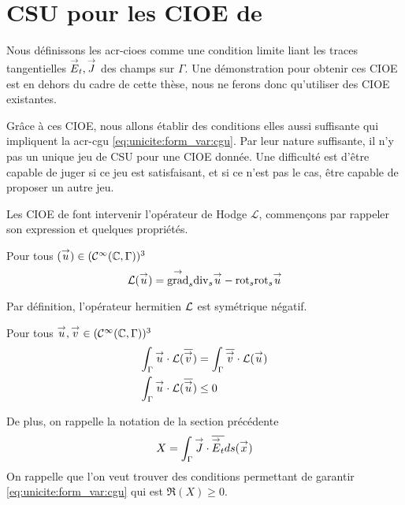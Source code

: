 \section{CSU pour les CIOE de \cite{stupfel_sufficient_2011}}

  Nous définissons les \glspl{acr-cioe} comme une condition limite liant les traces tangentielles \({\overset{\rightarrow}{E}}_t, {\overset{\rightarrow}{J}}\) des champs sur \(\Gamma\). Une démonstration pour obtenir ces CIOE est en dehors du cadre de cette thèse, nous ne ferons donc qu'utiliser des CIOE existantes. 

  Grâce à ces CIOE, nous allons établir des conditions elles aussi suffisante qui impliquent la \gls{acr-cgu} \eqref{eq:unicite:form_var:cgu}. Par leur nature suffisante, il n'y pas un unique jeu de CSU pour une CIOE donnée. Une difficulté est d'être capable de juger si ce jeu est satisfaisant, et si ce n'est pas le cas, être capable de proposer un autre jeu.

  Les CIOE de \cite{stupfel_sufficient_2011} font intervenir l'opérateur de Hodge \(\mathcal{L}\), commençons par rappeler son expression et quelques propriétés.

  \begin{defn}
    Pour tous \(({\overset{\rightarrow}{u}}) \in (\mathcal C^\infty(\mathbb C,\Gamma))^3\)
    \begin{equation}
      \mathcal{L}({\overset{\rightarrow}{u}}) = {{\overset{\rightarrow}{\operatorname{grad}}}_s}{{\operatorname{div}_s} {\overset{\rightarrow}{u}}} - {{\operatorname{rot}}_s}{{{\operatorname{rot}}_s} {\overset{\rightarrow}{u}}}
    \end{equation}
  \end{defn}

  \begin{prop}
    Par définition, l’opérateur hermitien \(\mathcal{L}\) est symétrique négatif.

    Pour tous \({\overset{\rightarrow}{u}},{\overset{\rightarrow}{v}} \in (\mathcal C^\infty(\mathbb C,\Gamma))^3\)
    \begin{align}
      \int_\Gamma {\overset{\rightarrow}{u}}\cdot \mathcal{L}({\overline{{\overset{\rightarrow}{v}}}}) &= \int_\Gamma {\overline{{\overset{\rightarrow}{v}}}}\cdot \mathcal{L}({\overset{\rightarrow}{u}})
      \\
      \int_\Gamma {\overset{\rightarrow}{u}}\cdot \mathcal{L}({\overline{{\overset{\rightarrow}{u}}}}) &\le 0
    \end{align}
  \end{prop}

  De plus, on rappelle la notation de la section précédente
  \begin{equation}
    X = \int_\Gamma {\overset{\rightarrow}{J}} \cdot {\overline{{\overset{\rightarrow}{E}}_t}} ds({\overset{\rightarrow}{x}})
    \label{eq:unicite:2011:X}
  \end{equation}
  On rappelle que l'on veut trouver des conditions permettant de garantir \eqref{eq:unicite:form_var:cgu} qui est \(\Re(X)\ge0\).

